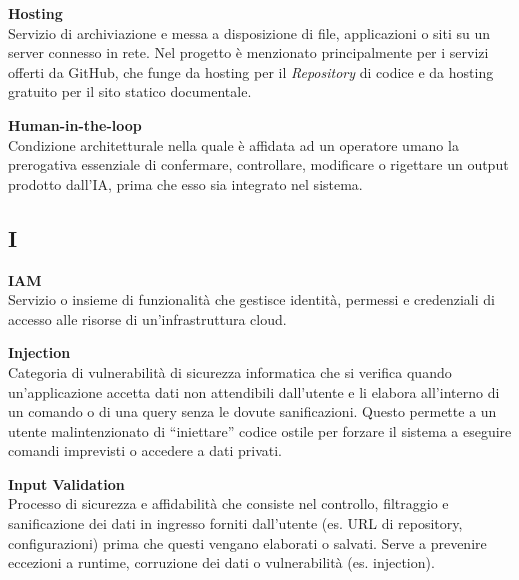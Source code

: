 \documentclass[12pt, a4paper]{article}
\begin{document}
\noindent\hypertarget{hosting}{\textbf{Hosting}} \\[0.1em]
Servizio di archiviazione e messa a disposizione di file, applicazioni o siti su un server connesso in rete. Nel progetto è menzionato principalmente per i servizi offerti da GitHub, che funge da hosting per il \textit{Repository} di codice e da hosting gratuito per il sito statico documentale.
\vspace{0.5cm}  

\noindent\hypertarget{human-in-the-loop}{\textbf{Human-in-the-loop}} \\[0.1em]
Condizione architetturale nella quale è affidata ad un operatore umano la prerogativa essenziale di confermare, controllare, modificare o rigettare un output prodotto dall'IA, prima che esso sia integrato nel sistema.
\vspace{0.1cm}
\newpage

\newpage
\subsection*{I}
{}
\vspace{0.2cm}

\noindent\hypertarget{iam}{\textbf{IAM}} \\[0.1em]
Servizio o insieme di funzionalità che gestisce identità, permessi e credenziali di accesso alle risorse di un'infrastruttura cloud.
\vspace{0.5cm}

\noindent\hypertarget{injection}{\textbf{Injection}} \\[0.1em]
Categoria di vulnerabilità di sicurezza informatica che si verifica quando un'applicazione accetta dati non attendibili dall'utente e li elabora all'interno di un comando o di una query senza le dovute sanificazioni. Questo permette a un utente malintenzionato di ``iniettare'' codice ostile per forzare il sistema a eseguire comandi imprevisti o accedere a dati privati.
\vspace{0.5cm}

\noindent\hypertarget{input-validation}{\textbf{Input Validation}} \\[0.1em]
Processo di sicurezza e affidabilità che consiste nel controllo, filtraggio e sanificazione dei dati in ingresso forniti dall'utente (es. URL di repository, configurazioni) prima che questi vengano elaborati o salvati. Serve a prevenire eccezioni a runtime, corruzione dei dati o vulnerabilità (es. injection).
\vspace{0.5cm}
\end{document}
